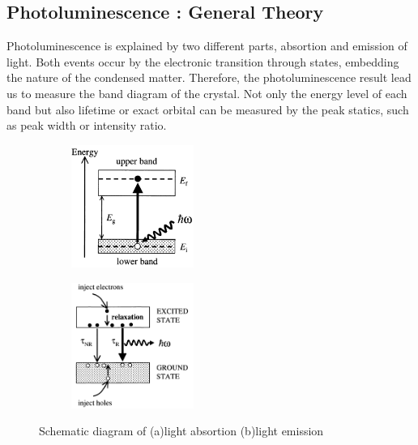 \documentclass{article}
\begin{document}
\subsection{Photoluminescence : General Theory}
 \label{intro:pl_general_theory}
 Photoluminescence is explained by two different parts, absortion and emission of light.
 Both events occur by the electronic transition through states, embedding the nature of the condensed matter.
 Therefore, the photoluminescence result lead us to measure the band diagram of the crystal.
 Not only the energy level of each band but also lifetime or exact orbital can be measured by the peak statics, such as peak width or intensity ratio.
 \begin{figure}[ht]
    \centering
    \begin{subfigure}[b]{6cm}
        \centering
        \includegraphics[width=4cm]{../results/intro_energy_absortion.png}
        \caption{}
    \end{subfigure}
    \hfill
    \begin{subfigure}[b]{6cm}
        \centering
        \includegraphics[width=4cm]{../results/intro_energy_emission.png}
        \caption{}
    \end{subfigure}
    \hfill
    \caption{Schematic diagram of (a)light absortion (b)light emission \cite{condensed_matter_optics}}
    \label{fig:pl_intro}
 \end{figure}
\end{document}
